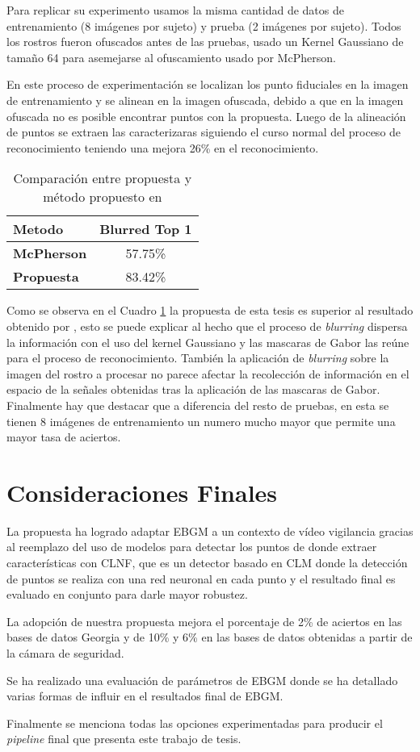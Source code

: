Para replicar su experimento usamos la misma cantidad de datos de entrenamiento (8 imágenes por sujeto) y prueba (2 imágenes por sujeto). 
Todos los rostros fueron ofuscados antes de las pruebas, usado un Kernel Gaussiano de tamaño 64 para asemejarse al ofuscamiento usado por McPherson. 

En este proceso de experimentación se localizan los punto fiduciales en la imagen de entrenamiento y se alinean en la imagen ofuscada, debido a que en la imagen ofuscada no es posible encontrar puntos con la propuesta. Luego de la alineación de puntos se extraen las caracterizaras siguiendo el curso normal del proceso de reconocimiento teniendo una mejora 26\% en el reconocimiento.

\begin{table}[]
\centering
\caption{Comparación entre propuesta y método propuesto en \cite{mcpherson2016defeating}}
\label{ta::Blurred}
\begin{tabular}{|l|c|}
\hline
\textbf{Metodo}    & \textbf{Blurred Top 1} \\ \hline
\textbf{McPherson} & 57.75\%                \\ \hline
\textbf{Propuesta} & 83.42\%                \\ \hline
\end{tabular}
\end{table}

Como se observa en el Cuadro \ref{ta::Blurred} la propuesta de esta tesis es superior al resultado obtenido por \cite{mcpherson2016defeating}, esto se puede explicar al hecho que el proceso de \textit{blurring} dispersa la información con el uso del kernel Gaussiano y las mascaras de Gabor las reúne para el proceso de reconocimiento. También la aplicación de \textit{blurring} sobre la imagen del rostro a procesar no parece afectar la recolección de información en el espacio de la señales obtenidas tras la aplicación de las mascaras de Gabor. Finalmente hay que destacar que a diferencia del resto de pruebas, en esta se tienen 8 imágenes de entrenamiento un numero mucho mayor que permite una mayor tasa de aciertos.
	
\section{Consideraciones Finales}

La propuesta ha logrado adaptar \ac{EBGM} a un contexto de vídeo vigilancia gracias al reemplazo del uso de modelos para detectar los puntos de donde extraer características con \ac{CLNF}, que es un detector basado en \ac{CLM} donde la detección de puntos se realiza con una red neuronal en cada punto y el resultado final es evaluado en conjunto para darle mayor robustez.

La adopción de nuestra propuesta mejora el porcentaje de 2\% de aciertos en las bases de datos Georgia y de 10\% y 6\% en las bases de datos obtenidas a partir de la cámara de seguridad.

Se ha realizado una evaluación de parámetros de \ac{EBGM} donde se ha detallado varias formas de influir en el resultados final de \ac{EBGM}.  

Finalmente se menciona todas las opciones experimentadas para producir el \textit{pipeline} final que presenta este trabajo de tesis.
